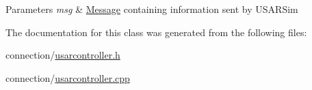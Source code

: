 \begin{DoxyParams}{Parameters}
{\em msg} & \hyperlink{classMessage}{Message} containing information sent by USARSim \\
\hline
\end{DoxyParams}


The documentation for this class was generated from the following files:\begin{DoxyCompactItemize}
\item 
connection/\hyperlink{usarcontroller_8h}{usarcontroller.h}\item 
connection/\hyperlink{usarcontroller_8cpp}{usarcontroller.cpp}\end{DoxyCompactItemize}
